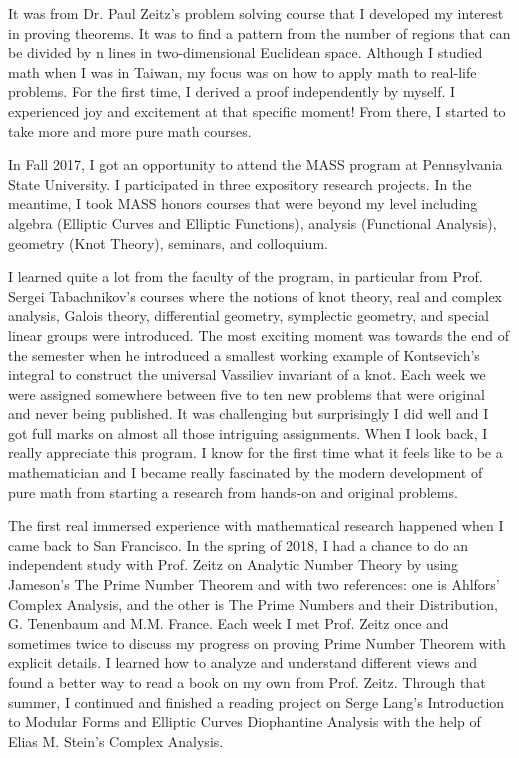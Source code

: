 \documentclass[11pt]{amsart}
\begin{document}
It was from Dr. Paul Zeitz’s problem solving course that I developed my interest in proving theorems. It was to find a pattern from the number of regions that can be divided by n lines in two-dimensional Euclidean space. Although I studied math when I was in Taiwan, my focus was on how to apply math to real-life problems. For the first time, I derived a proof independently by myself. I experienced joy and excitement at that specific moment! From there, I started to take more and more pure math courses.

In Fall 2017, I got an opportunity to attend the MASS program at Pennsylvania State University. I participated in three expository research projects. In the meantime, I took MASS honors courses that were beyond my level including algebra (Elliptic Curves and Elliptic Functions), analysis (Functional Analysis), geometry (Knot Theory), seminars, and colloquium.

I learned quite a lot from the faculty of the program, in particular from Prof. Sergei Tabachnikov’s courses where the notions of knot theory, real and complex analysis, Galois theory, differential geometry, symplectic geometry, and special linear groups were introduced. The most exciting moment was towards the end of the semester when he introduced a smallest working example of Kontsevich’s integral to construct the universal Vassiliev invariant of a knot. Each week we were assigned somewhere between five to ten new problems that were original and never being published. It was challenging but surprisingly I did well and I got full marks on almost all those intriguing assignments. When I look back, I really appreciate this program. I know for the first time what it feels like to be a mathematician and I became really fascinated by the modern development of pure math from starting a research from hands-on and original problems.


The first real immersed experience with mathematical research happened when I came back to San Francisco. In the spring of 2018, I had a chance to do an independent study with Prof. Zeitz on Analytic Number Theory by using Jameson’s The Prime Number Theorem and with two references: one is Ahlfors’ Complex Analysis, and the other is The Prime Numbers and their Distribution, G. Tenenbaum and M.M. France. Each week I met Prof. Zeitz once and sometimes twice to discuss my progress on proving Prime Number Theorem with explicit details. I learned how to analyze and understand different views and found a better way to read a book on my own from Prof. Zeitz. Through that summer, I continued and finished a reading project on Serge Lang’s Introduction to Modular Forms and Elliptic Curves Diophantine Analysis with the help of Elias M. Stein’s Complex Analysis.
\end{document}
